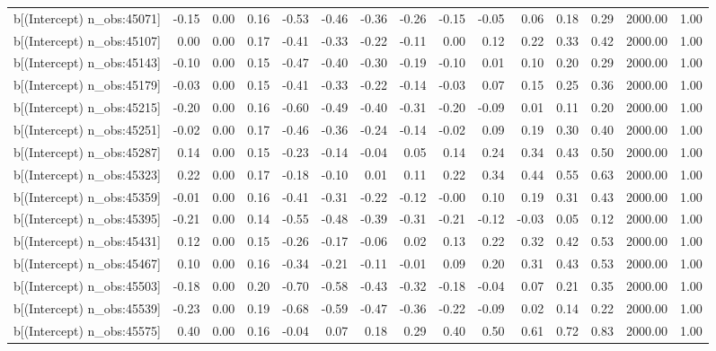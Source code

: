 \begin{table}[ht]
\begin{tabular}{rrrrrrrrrrrrrrr}
  b[(Intercept) n\_obs:45071] & -0.15 & 0.00 & 0.16 & -0.53 & -0.46 & -0.36 & -0.26 & -0.15 & -0.05 & 0.06 & 0.18 & 0.29 & 2000.00 & 1.00 \\ 
  b[(Intercept) n\_obs:45107] & 0.00 & 0.00 & 0.17 & -0.41 & -0.33 & -0.22 & -0.11 & 0.00 & 0.12 & 0.22 & 0.33 & 0.42 & 2000.00 & 1.00 \\ 
  b[(Intercept) n\_obs:45143] & -0.10 & 0.00 & 0.15 & -0.47 & -0.40 & -0.30 & -0.19 & -0.10 & 0.01 & 0.10 & 0.20 & 0.29 & 2000.00 & 1.00 \\ 
  b[(Intercept) n\_obs:45179] & -0.03 & 0.00 & 0.15 & -0.41 & -0.33 & -0.22 & -0.14 & -0.03 & 0.07 & 0.15 & 0.25 & 0.36 & 2000.00 & 1.00 \\ 
  b[(Intercept) n\_obs:45215] & -0.20 & 0.00 & 0.16 & -0.60 & -0.49 & -0.40 & -0.31 & -0.20 & -0.09 & 0.01 & 0.11 & 0.20 & 2000.00 & 1.00 \\ 
  b[(Intercept) n\_obs:45251] & -0.02 & 0.00 & 0.17 & -0.46 & -0.36 & -0.24 & -0.14 & -0.02 & 0.09 & 0.19 & 0.30 & 0.40 & 2000.00 & 1.00 \\ 
  b[(Intercept) n\_obs:45287] & 0.14 & 0.00 & 0.15 & -0.23 & -0.14 & -0.04 & 0.05 & 0.14 & 0.24 & 0.34 & 0.43 & 0.50 & 2000.00 & 1.00 \\ 
  b[(Intercept) n\_obs:45323] & 0.22 & 0.00 & 0.17 & -0.18 & -0.10 & 0.01 & 0.11 & 0.22 & 0.34 & 0.44 & 0.55 & 0.63 & 2000.00 & 1.00 \\ 
  b[(Intercept) n\_obs:45359] & -0.01 & 0.00 & 0.16 & -0.41 & -0.31 & -0.22 & -0.12 & -0.00 & 0.10 & 0.19 & 0.31 & 0.43 & 2000.00 & 1.00 \\ 
  b[(Intercept) n\_obs:45395] & -0.21 & 0.00 & 0.14 & -0.55 & -0.48 & -0.39 & -0.31 & -0.21 & -0.12 & -0.03 & 0.05 & 0.12 & 2000.00 & 1.00 \\ 
  b[(Intercept) n\_obs:45431] & 0.12 & 0.00 & 0.15 & -0.26 & -0.17 & -0.06 & 0.02 & 0.13 & 0.22 & 0.32 & 0.42 & 0.53 & 2000.00 & 1.00 \\ 
  b[(Intercept) n\_obs:45467] & 0.10 & 0.00 & 0.16 & -0.34 & -0.21 & -0.11 & -0.01 & 0.09 & 0.20 & 0.31 & 0.43 & 0.53 & 2000.00 & 1.00 \\ 
  b[(Intercept) n\_obs:45503] & -0.18 & 0.00 & 0.20 & -0.70 & -0.58 & -0.43 & -0.32 & -0.18 & -0.04 & 0.07 & 0.21 & 0.35 & 2000.00 & 1.00 \\ 
  b[(Intercept) n\_obs:45539] & -0.23 & 0.00 & 0.19 & -0.68 & -0.59 & -0.47 & -0.36 & -0.22 & -0.09 & 0.02 & 0.14 & 0.22 & 2000.00 & 1.00 \\ 
  b[(Intercept) n\_obs:45575] & 0.40 & 0.00 & 0.16 & -0.04 & 0.07 & 0.18 & 0.29 & 0.40 & 0.50 & 0.61 & 0.72 & 0.83 & 2000.00 & 1.00 \\ 

\end{tabular}
\end{table}
